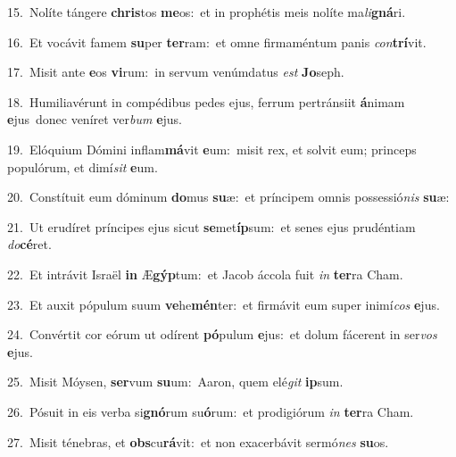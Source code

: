 {\numbfont\textcolor{\numbcolor}{15.}}~Nolíte tángere \textbf{chris}\-tos \textbf{me}\-os:~\star et in prophétis meis nolíte ma\-\textit{li}\-\textbf{gná}ri.\par
{\numbfont\textcolor{\numbcolor}{16.}}~Et vocávit famem \textbf{su}\-per \textbf{ter}\-ram:~\star et omne firmaméntum panis \textit{con}\-\textbf{trí}vit.\par
{\numbfont\textcolor{\numbcolor}{17.}}~Misit ante \textbf{e}\-os \textbf{vi}\-rum:~\star in servum venúmdatus \textit{est} \textbf{Jo}\-seph.\par
{\numbfont\textcolor{\numbcolor}{18.}}~Humiliavérunt in compédibus pedes ejus, ferrum pertránsiit \textbf{á}\-nimam \textbf{e}\-jus~\star donec veníret ver\textit{bum} \textbf{e}\-jus.\par
{\numbfont\textcolor{\numbcolor}{19.}}~Elóquium Dómini inflam\-\textbf{má}\-vit \textbf{e}\-um:~\star misit rex, et solvit eum; princeps populórum, et dimí\textit{sit} \textbf{e}\-um.\par
{\numbfont\textcolor{\numbcolor}{20.}}~Constítuit eum dóminum \textbf{do}\-mus \textbf{su}\-æ:~\star et príncipem omnis possessió\textit{nis} \textbf{su}\-æ:\par
{\numbfont\textcolor{\numbcolor}{21.}}~Ut erudíret príncipes ejus sicut \textbf{se}\-met\-\textbf{íp}\-sum:~\star et senes ejus prudéntiam \textit{do}\-\textbf{cé}ret.\par
{\numbfont\textcolor{\numbcolor}{22.}}~Et intrávit Israël \textbf{in} Æ\-\textbf{gýp}\-tum:~\star et Jacob áccola fuit \textit{in} \textbf{ter}\-ra Cham.\par
{\numbfont\textcolor{\numbcolor}{23.}}~Et auxit pópulum suum \textbf{ve}\-he\-\textbf{mén}\-ter:~\star et firmávit eum super inimí\textit{cos} \textbf{e}\-jus.\par
{\numbfont\textcolor{\numbcolor}{24.}}~Convértit cor eórum ut odírent \textbf{pó}\-pulum \textbf{e}\-jus:~\star et dolum fácerent in ser\textit{vos} \textbf{e}\-jus.\par
{\numbfont\textcolor{\numbcolor}{25.}}~Misit Móysen, \textbf{ser}\-vum \textbf{su}\-um:~\star Aaron, quem elé\textit{git} \textbf{ip}\-sum.\par
{\numbfont\textcolor{\numbcolor}{26.}}~Pósuit in eis verba si\-\textbf{gnó}\-rum su\-\textbf{ó}\-rum:~\star et prodigiórum \textit{in} \textbf{ter}\-ra Cham.\par
{\numbfont\textcolor{\numbcolor}{27.}}~Misit ténebras, et \textbf{obs}\-cu\-\textbf{rá}\-vit:~\star et non exacerbávit sermó\textit{nes} \textbf{su}\-os.\par
